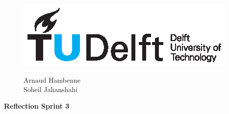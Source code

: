 \documentclass[11pt]{article}
\begin{document}
\thispagestyle{fancy}
\begin{figure}
    \begin{minipage}[H]{0.33\textwidth}
		\vspace{0.3cm}
		\includegraphics[scale=0.8]{img/TUDelftLogo.eps}
	\end{minipage}
	\begin{minipage}[H]{0.34\textwidth}
		\begin{center}
			\selectfont \textcolor{blue}{}
		\end{center}
		
	
	\end{minipage}
	\begin{minipage}[H]{0.33\textwidth}
			\begin{flushright}

				\small{Arnaud Hambenne }\\
				\small{Soheil Jahanshahi }\\
				

			\end{flushright}
			
	\end{minipage}
\end{figure}


\begin{minipage}[H]{\textwidth}
\vspace{0.3cm}
		\begin{center}
		
		\vspace{0.3cm}
			\Large{\selectfont \textbf{Reflection Sprint 3}}\\
		\vspace{0.3cm}	
		
		\vspace{0.7cm}	
		\end{center}
	\end{minipage}
\end{document}
